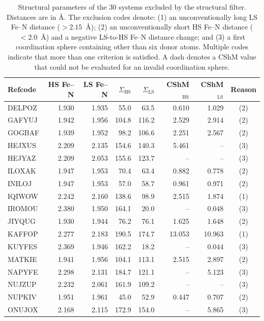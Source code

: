 \begin{table}[htbp]
\centering
\scriptsize
\setlength{\tabcolsep}{3.5pt}
\caption{Structural parameters of the 30 systems excluded by the structural filter. Distances are in \AA{}. The exclusion codes denote: (1) an unconventionally long LS Fe--N distance ($>2.15$~\AA{}); (2) an unconventionally short HS Fe--N distance ($<2.0$~\AA{}) and a negative LS-to-HS Fe--N distance change; and (3) a first coordination sphere containing other than six donor atoms. Multiple codes indicate that more than one criterion is satisfied. A dash denotes a CShM value that could not be evaluated for an invalid coordination sphere.}
\label{SI-tab:structural-outliers}
\begin{tabular}{lrrrrrrc}
\hline
Refcode & HS Fe--N & LS Fe--N & $\Sigma_{\mathrm{HS}}$ & $\Sigma_{\mathrm{LS}}$ & CShM$_{\mathrm{HS}}$ & CShM$_{\mathrm{LS}}$ & Reason \\
\hline
DELPOZ & 1.930 & 1.935 & 55.0 & 63.5 & 0.610 & 1.029 & (2) \\
GAFYUJ & 1.942 & 1.956 & 104.8 & 116.2 & 2.529 & 2.914 & (2) \\
GOGBAF & 1.939 & 1.952 & 98.2 & 106.6 & 2.251 & 2.567 & (2) \\
HEJXUS & 2.209 & 2.135 & 154.6 & 140.3 & 5.461 & -- & (3) \\
HEJYAZ & 2.209 & 2.053 & 155.6 & 123.7 & -- & -- & (3) \\
ILOXAK & 1.947 & 1.953 & 70.4 & 63.4 & 0.882 & 0.778 & (2) \\
INILOJ & 1.947 & 1.953 & 57.0 & 58.7 & 0.961 & 0.971 & (2) \\
IQIWOW & 2.242 & 2.160 & 138.6 & 98.9 & 2.515 & 1.874 & (1) \\
IROMOU & 2.380 & 1.950 & 164.1 & 20.0 & -- & 0.048 & (3) \\
JIYQUG & 1.930 & 1.944 & 76.2 & 76.1 & 1.625 & 1.648 & (2) \\
KAFFOP & 2.277 & 2.183 & 190.5 & 174.7 & 13.053 & 10.963 & (1) \\
KUYFES & 2.369 & 1.946 & 162.2 & 18.2 & -- & 0.044 & (3) \\
MATKIE & 1.941 & 1.956 & 104.1 & 113.1 & 2.515 & 2.897 & (2) \\
NAPYFE & 2.298 & 2.131 & 184.7 & 121.1 & -- & 5.123 & (3) \\
NUJZUP & 2.232 & 2.061 & 161.9 & 109.2 & -- & -- & (3) \\
NUPKIV & 1.951 & 1.961 & 45.0 & 52.9 & 0.447 & 0.707 & (2) \\
ONUJOX & 2.168 & 2.115 & 172.9 & 154.0 & -- & 5.865 & (3) \\

\end{tabular}
\end{table}
